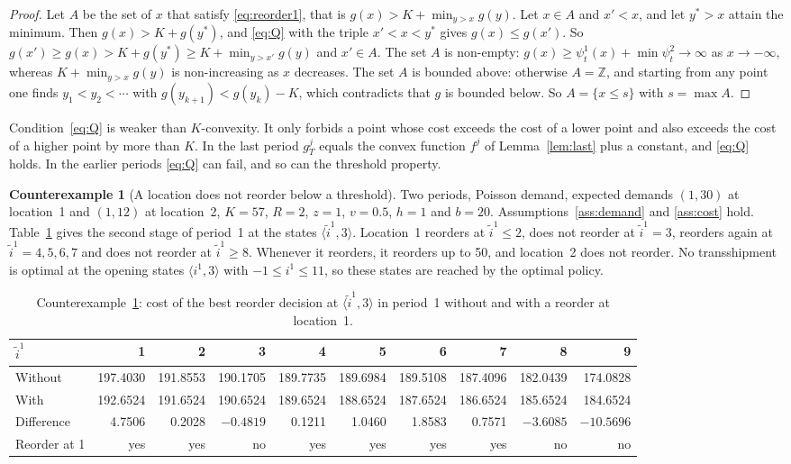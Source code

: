 \documentclass[11pt]{article}
\newcommand{\Z}{\mathbb{Z}}
\theoremstyle{definition}
\newtheorem{example}{Counterexample}
\begin{document}
\begin{proof}
Let $A$ be the set of $x$ that satisfy \eqref{eq:reorder1}, that is $g(x)>K+\min_{y>x}g(y)$. Let $x\in A$ and $x'<x$, and let $y^*>x$ attain the minimum. Then $g(x)>K+g(y^*)$, and \eqref{eq:Q} with the triple $x'<x<y^*$ gives $g(x)\le g(x')$. So $g(x')\ge g(x)>K+g(y^*)\ge K+\min_{y>x'}g(y)$ and $x'\in A$. The set $A$ is non-empty: $g(x)\ge\psi^1_t(x)+\min\psi^2_t\to\infty$ as $x\to-\infty$, whereas $K+\min_{y>x}g(y)$ is non-increasing as $x$ decreases. The set $A$ is bounded above: otherwise $A=\Z$, and starting from any point one finds $y_1<y_2<\cdots$ with $g(y_{k+1})<g(y_k)-K$, which contradicts that $g$ is bounded below. So $A=\{x\le s\}$ with $s=\max A$.
\end{proof}

Condition~\eqref{eq:Q} is weaker than $K$-convexity. It only forbids a point whose cost exceeds the cost of a lower point and also exceeds the cost of a higher point by more than $K$. In the last period $g^j_T$ equals the convex function $f^j$ of Lemma~\ref{lem:last} plus a constant, and \eqref{eq:Q} holds. In the earlier periods \eqref{eq:Q} can fail, and so can the threshold property.

\begin{example}[A location does not reorder below a threshold]\label{ex:threshold}
Two periods, Poisson demand, expected demands $(1,30)$ at location~1 and $(1,12)$ at location~2, $K=57$, $R=2$, $z=1$, $v=0.5$, $h=1$ and $b=20$. Assumptions~\ref{ass:demand} and \ref{ass:cost} hold. Table~\ref{tab:threshold} gives the second stage of period~1 at the states $\langle\tilde{i}^1,3\rangle$. Location~1 reorders at $\tilde{i}^1\le2$, does not reorder at $\tilde{i}^1=3$, reorders again at $\tilde{i}^1=4,5,6,7$ and does not reorder at $\tilde{i}^1\ge8$. Whenever it reorders, it reorders up to 50, and location~2 does not reorder. No transshipment is optimal at the opening states $\langle i^1,3\rangle$ with $-1\le i^1\le11$, so these states are reached by the optimal policy.
\end{example}

\begin{table}[h]
\centering
\footnotesize
\setlength{\tabcolsep}{2.6pt}
\caption{Counterexample~\ref{ex:threshold}: cost of the best reorder decision at $\langle\tilde{i}^1,3\rangle$ in period~1 without and with a reorder at location~1.}\label{tab:threshold}
\begin{tabular}{lrrrrrrrrr}
\toprule
$\tilde{i}^1$ & 1 & 2 & 3 & 4 & 5 & 6 & 7 & 8 & 9 \\
\midrule
Without & 197.4030 & 191.8553 & 190.1705 & 189.7735 & 189.6984 & 189.5108 & 187.4096 & 182.0439 & 174.0828 \\
With & 192.6524 & 191.6524 & 190.6524 & 189.6524 & 188.6524 & 187.6524 & 186.6524 & 185.6524 & 184.6524 \\
Difference & 4.7506 & 0.2028 & $-0.4819$ & 0.1211 & 1.0460 & 1.8583 & 0.7571 & $-3.6085$ & $-10.5696$ \\
Reorder at 1 & yes & yes & no & yes & yes & yes & yes & no & no \\
\bottomrule
\end{tabular}
\end{table}
\end{document}
